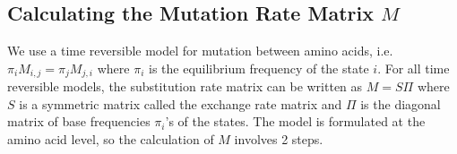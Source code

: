 

\subsection*{Calculating the Mutation Rate Matrix $M$}
We use a time reversible model for mutation between amino acids, i.e. $\pi_i M_{i,j} = \pi_j M_{j,i}$ where $\pi_i$ is the equilibrium frequency of the state $i$.
For all time reversible models, the substitution rate matrix can be written as $M=S\Pi$ where $S$ is a symmetric matrix called the exchange rate matrix and $\Pi$ is the diagonal matrix of base frequencies $\pi_i$'s of the states. The model is formulated at the amino acid level, so the calculation of $M$ involves 2 steps.



